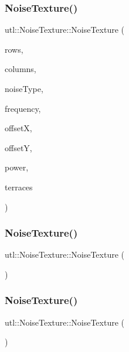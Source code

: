 \subsubsection{\texorpdfstring{Noise\+Texture()}{NoiseTexture()}\hspace{0.1cm}{\footnotesize\ttfamily [1/3]}}
{\footnotesize\ttfamily utl\+::\+Noise\+Texture\+::\+Noise\+Texture (\begin{DoxyParamCaption}\item[{unsigned int}]{rows,  }\item[{unsigned int}]{columns,  }\item[{\mbox{\hyperlink{namespaceutl_a42b249122648f147a9f518c8661cc8d2}{Noise\+Type}}}]{noise\+Type,  }\item[{float}]{frequency,  }\item[{float}]{offsetX,  }\item[{float}]{offsetY,  }\item[{float}]{power,  }\item[{const unsigned int}]{terraces }\end{DoxyParamCaption})}

\mbox{\label{classutl_1_1_noise_texture_aa64a5aad241c595b8deb5fce6ce9e277}} 
\subsubsection{\texorpdfstring{Noise\+Texture()}{NoiseTexture()}\hspace{0.1cm}{\footnotesize\ttfamily [2/3]}}
{\footnotesize\ttfamily utl\+::\+Noise\+Texture\+::\+Noise\+Texture (\begin{DoxyParamCaption}\item[{const \mbox{\hyperlink{classutl_1_1_noise_texture}{Noise\+Texture}} \&}]{ }\end{DoxyParamCaption})\hspace{0.3cm}{\ttfamily [delete]}}

\mbox{\label{classutl_1_1_noise_texture_ae3d61cfa25de0be38ebb05113a6e4170}} 
\subsubsection{\texorpdfstring{Noise\+Texture()}{NoiseTexture()}\hspace{0.1cm}{\footnotesize\ttfamily [3/3]}}
{\footnotesize\ttfamily utl\+::\+Noise\+Texture\+::\+Noise\+Texture (\begin{DoxyParamCaption}\item[{\mbox{\hyperlink{classutl_1_1_noise_texture}{Noise\+Texture}} \&\&}]{ }\end{DoxyParamCaption})\hspace{0.3cm}{\ttfamily [default]}}

